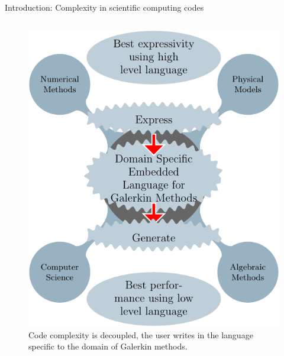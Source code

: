 \documentclass[final,utf8,,hyperref={pdfpagelabels=false}]{beamer}
\begin{document}
\begin{frame}[containsverbatim]{}
\begin{columns}[t]
\begin{block}{Introduction: Complexity in scientific computing codes}
\begin{columns}[t]
\begin{figure}[c]
          \includegraphics[width=.9\linewidth]{genprog2-crop}
          \caption{Code complexity is decoupled, the user writes in the language
          specific to the domain of Galerkin methods.}
          \label{fig:10}
      \end{figure}
      \end{columns}
      
    

\end{block}
\end{columns}
\end{frame}
\end{document}
